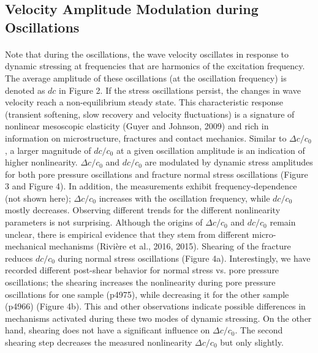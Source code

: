 \clearpage

\subsection{Velocity Amplitude Modulation during Oscillations}
\paragraph{}
Note that during the oscillations, the wave velocity oscillates in response to dynamic stressing at frequencies that are harmonics of the excitation frequency. The average amplitude of these oscillations (at the oscillation frequency) is denoted as $ dc $ in Figure 2. If the stress oscillations persist, the changes in wave velocity reach a non-equilibrium steady state. This characteristic response (transient softening, slow recovery and velocity fluctuations) is a signature of nonlinear mesoscopic elasticity (Guyer and Johnson, 2009) and rich in information on microstructure, fractures and contact mechanics. Similar to $ \Delta c/c_0 $ , a larger magnitude of
$ dc/c_0 $ at a given oscillation amplitude is an indication of higher nonlinearity.
$ \Delta c/c_0 $ and $ dc/c_0 $ are modulated by dynamic stress amplitudes for both pore pressure oscillations and fracture normal stress oscillations (Figure 3 and Figure 4). In addition, the measurements exhibit frequency-dependence (not shown here); $ \Delta c/c_0 $ increases with the oscillation frequency, while $ dc/c_0 $ mostly decreases. Observing different trends for the different nonlinearity parameters is not surprising. Although the origins of $ \Delta c/c_0 $ and $ dc/c_0 $ remain unclear, there is empirical evidence that they stem from different micro-mechanical mechanisms (Rivière et al., 2016, 2015). 
Shearing of the fracture reduces $ dc/c_0 $ during normal stress oscillations (Figure 4a). Interestingly, we have recorded different post-shear behavior for normal stress vs. pore pressure oscillations; the shearing increases the nonlinearity during pore pressure oscillations for one sample (p4975), while decreasing it for the other sample (p4966) (Figure 4b). This and other observations indicate possible differences in mechanisms activated during these two modes of dynamic stressing. On the other hand, shearing does not have a significant influence on $ \Delta c/c_0 $. The second shearing step decreases the measured nonlinearity $ \Delta c/c_0 $ but only slightly.


